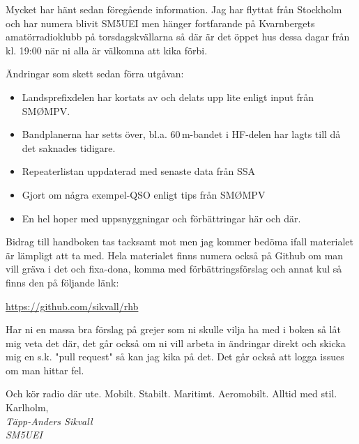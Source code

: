 Mycket har hänt sedan föregående information. Jag har flyttat från
Stockholm och har numera blivit SM5UEI men hänger fortfarande på
Kvarnbergets amatörradioklubb på torsdagskvällarna så där är det öppet
hus dessa dagar från kl. 19:00 när ni alla är välkomna att kika förbi.

Ändringar som skett sedan förra utgåvan:

\begin{itemize}[]
	\item Landsprefixdelen har kortats av och delats upp lite enligt 
	input från SMØMPV.
	\item Bandplanerna har setts över, bl.a. 60\,m-bandet i HF-delen 
	har lagts till då det saknades tidigare.
	\item Repeaterlistan uppdaterad med senaste data från SSA
	\item Gjort om några exempel-QSO enligt tips från SMØMPV
	\item En hel hoper med uppsnyggningar och förbättringar här och där.
\end{itemize}

Bidrag till handboken tas tacksamt mot men jag kommer bedöma ifall
materialet är lämpligt att ta med.  Hela materialet finns numera också
på Github om man vill gräva i det och fixa-dona, komma med 
förbättrings\-förslag och annat kul så finns den på följande länk:

\href{https://github.com/sikvall/rhb/}{https://github.com/sikvall/rhb}

Har ni en massa bra förslag på grejer som ni skulle vilja ha med i boken
så låt mig veta det där, det går också om ni vill arbeta in ändringar direkt
och skicka mig en s.k. "pull request" så kan jag kika på det. Det går också
att logga issues om man hittar fel.

Och kör radio där ute. Mobilt. Stabilt. Maritimt. Aeromobilt. Alltid med
stil.\\[4em]

Karlholm, \DokumentDatum\\
\textit{Täpp-Anders Sikvall\\
	SM5UEI}

\clearpage
	
